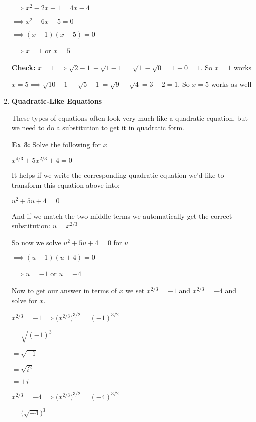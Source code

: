 \documentclass[12pt]{article}
\begin{document}
\begin{enumerate}
$\implies x^2 - 2x + 1 = 4x-4$

$\implies x^2 - 6x + 5= 0$

$\implies (x-1)(x-5)= 0$

$\implies x = 1$ or $x = 5$

\textbf{Check:} $x = 1 \implies \sqrt{2 - 1} - \sqrt{1-1} = \sqrt{1} - \sqrt{0} = 1 - 0 = 1$. So $x = 1$ works

$x = 5 \implies \sqrt{10 - 1} - \sqrt{5-1} = \sqrt{9} - \sqrt{4} = 3 - 2 = 1$. So $x = 5$ works as well


\item \textbf{Quadratic-Like Equations}

These types of equations often look very much like a quadratic equation, but we need to do a substitution to get it in quadratic form. 

\textbf{Ex 3:} Solve the following for $x$
\newline

\centerline{$x^{4/3} + 5x^{2/3} + 4 = 0$}

It helps if we write the corresponding quadratic equation we'd like to transform this equation above into:
\newline

\centerline{$u^{2} + 5u + 4 = 0$}

And if we match the two middle terms we automatically get the correct substitution: $u = x^{2/3}$

So now we solve $u^{2} + 5u + 4 = 0$ for $u$

$\implies (u+1)(u+4) = 0$

$\implies u = -1$ or $u = -4$

Now to get our answer in terms of $x$ we set $x^{2/3} = -1$ and $x^{2/3} = -4$ and solve for $x$.

$x^{2/3} = -1 \implies \Big(x^{2/3}\Big)^{3/2} = (-1)^{3/2}$

\hspace{4.5cm}$ = \sqrt{(-1)^{3}}$

\hspace{4.5cm}$ = \sqrt{-1}$

\hspace{4.5cm}$ = \sqrt{i^{2}}$ 

\hspace{4.5cm}$= \pm i$

$x^{2/3} = -4 \implies  \Big(x^{2/3}\Big)^{3/2} = (-4)^{3/2} $

\hspace{4.5cm} $= \Big(\sqrt{-4}\Big)^{3}$ 


\end{enumerate}
\end{document}
